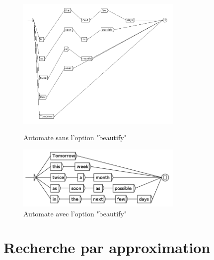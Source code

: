 \begin{figure}[!ht]
	\begin{minipage}[h!]{0.5\linewidth}
		\centering
		\includegraphics[width=8cm]{resources/img/fig8-5GRFnoBeautify.png}	
		\caption{Automate sans l'option "beautify"\label{fig8-5GRFnoBeautify}}
	\end{minipage}
	\hspace{0.1cm}
	\begin{minipage}[h!]{0.5\linewidth}
		\centering
		\includegraphics[width=8cm]{resources/img/fig8-6GRFBeautify.png}
		\caption{Automate avec l'option "beautify"\label{fig8-6GRFBeautify}}
	\end{minipage}
	\hspace{0.1cm}
\end{figure}
\pagebreak


\section{Recherche par approximation}
\label{approximation}

